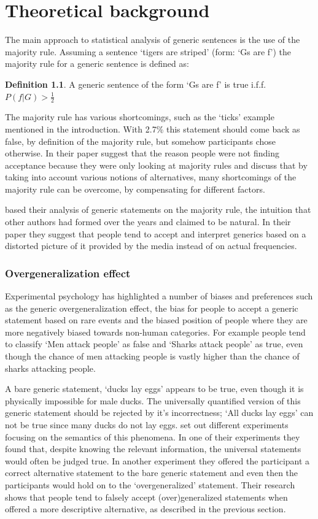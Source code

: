 \documentclass[twoside]{uva-inf-bachelor-thesis}
\theoremstyle{definition}
\newtheorem{definition}{Definition}[section]
\begin{document}
\chapter{Theoretical background}
The main approach to statistical analysis of generic sentences is the use of the majority rule. Assuming a sentence `tigers are striped' (form: `Gs are f') the majority rule for a generic sentence is defined as:
\theoremstyle{definition}
\begin{definition}
A generic sentence of the form `Gs are f' is true i.f.f. $P(f|G) > \frac{1}{2}$
\end{definition}
The majority rule has various shortcomings, such as the `ticks' example mentioned in the introduction. With 2.7\% this statement should come back as false, by definition of the majority rule, but somehow participants chose otherwise. In their paper \cite{RooijSchulzGenAlt} suggest that the reason people were not finding acceptance because they were only looking at majority rules and discuss that by taking into account various notions of alternatives, many shortcomings of the majority rule can be overcome, by compensating for different factors.

\cite{van2020generics} based their analysis of generic statements on the majority rule, the intuition that other authors had formed over the years and claimed to be natural. In their paper they suggest that people tend to accept and interpret generics based on a distorted picture of it provided by the media instead of on actual frequencies.


\subsection{Overgeneralization effect}
Experimental psychology has highlighted a number of biases and preferences such as the generic overgeneralization effect, the bias for people to accept a generic statement based on rare events and the biased position of people where they are more negatively biased towards non-human categories. For example people tend to classify `Men attack people' as false and `Sharks attack people' as true, even though the chance of men attacking people is vastly higher than the chance of sharks attacking people. 

A bare generic statement, `ducks lay eggs' appears to be true, even though it is physically impossible for male ducks.
The universally quantified version of this generic statement should be rejected by it's incorrectness; `All ducks lay eggs' can not be true since many ducks do not lay eggs. \cite{leslie2011all} set out different experiments focusing on the semantics of this phenomena. In one of their experiments they found that, despite knowing the relevant information, the universal statements would often be judged true. In another experiment they offered the participant a correct alternative statement to the bare generic statement and even then the participants would hold on to the `overgeneralized' statement. Their research shows that people tend to falsely accept (over)generalized statements when offered a more descriptive alternative, as described in the previous section. 
\end{document}
